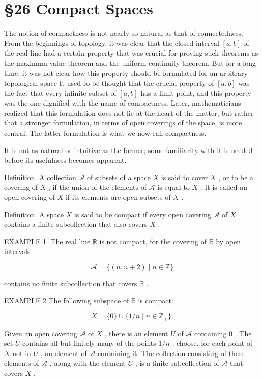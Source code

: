 \documentclass[10pt]{article}
\begin{document}
\section*{§26 Compact Spaces}

The notion of compactness is not nearly so natural as that of connectedness. From the beginnings of topology, it was clear that the closed interval \(\left\lbrack  {a,b}\right\rbrack\) of the real line had a certain property that was crucial for proving such theorems as the maximum value theorem and the uniform continuity theorem. But for a long time, it was not clear how this property should be formulated for an arbitrary topological space It used to be thought that the crucial property of \(\left\lbrack  {a,b}\right\rbrack\) was the fact that every infinite subset of \(\left\lbrack  {a,b}\right\rbrack\) has a limit point, and this property was the one dignified with the name of compactness. Later, mathematicians realized that this formulation does not lie at the heart of the matter, but rather that a stronger formulation, in terms of open coverings of the space, is more central. The latter formulation is what we now call compactness.

It is not as natural or intuitive as the former; some familiarity with it is needed before its usefulness becomes apparent.

Definition. A collection \(\mathcal{A}\) of subsets of a space \(X\) is said to cover \(X\) , or to be a covering of \(X\) , if the union of the elements of \(\mathcal{A}\) is equal to \(X\) . It is called an open covering of \(X\) if its elements are open subsets of \(X\) .

Definition. A space \(X\) is said to be compact if every open covering \(\mathcal{A}\) of \(X\) contains a finite subcollection that also covers \(X\) .

EXAMPLE 1. The real line \(\mathbb{R}\) is not compact, for the covering of \(\mathbb{R}\) by open intervals

\[
\mathcal{A} = \{ \left( {n,n + 2}\right)  \mid  n \in  \mathbb{Z}\}
\]

contains no finite subcollection that covers \(\mathbb{R}\) .

EXAMPLE 2 The following subspace of \(\mathbb{R}\) is compact:

\[
X = \{ 0\}  \cup  \{ 1/n \mid  n \in  {\mathbb{Z}}_{ + }\} .
\]

Given an open covering \(\mathcal{A}\) of \(X\) , there is an element \(U\) of \(\mathcal{A}\) containing 0 . The set \(U\) contains all but finitely many of the points \(1/n\) ; choose, for each point of \(X\) not in \(U\) , an element of \(\mathcal{A}\) containing it. The collection consisting of these elements of \(\mathcal{A}\) , along with the element \(U\) , is a finite subcollection of \(\mathcal{A}\) that covers \(X\) .
\end{document}
